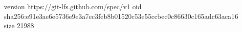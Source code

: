version https://git-lfs.github.com/spec/v1
oid sha256:e91e3ae6e5736e9e3a7ec3feb8b01520c53e55ccbec0c86630c165adc63aca16
size 21988
